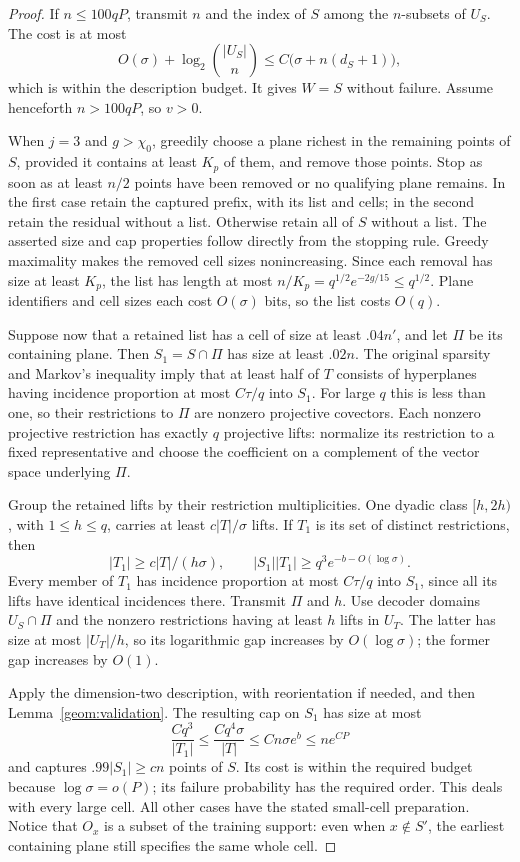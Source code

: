 \begin{proof}
If $n\leq100qP$, transmit $n$ and the index of $S$ among the
$n$-subsets of $U_S$. The cost is at most
\[
 O(\sigma)+\log_2\binom{|U_S|}{n}
 \leq C\bigl(\sigma+n(d_S+1)\bigr),
\]
which is within the description budget. It gives $W=S$ without
failure. Assume henceforth $n>100qP$, so $v>0$.

When $j=3$ and $g>\chi_0$, greedily choose a plane richest in the
remaining points of $S$, provided it contains at least $K_p$ of them,
and remove those points. Stop as soon as at least $n/2$ points have
been removed or no qualifying plane remains. In the first case retain
the captured prefix, with its list and cells; in the second retain the
residual without a list. Otherwise retain all of $S$ without a list.
The asserted size and cap properties follow directly from the stopping
rule. Greedy maximality makes the removed cell sizes nonincreasing.
Since each removal has size at least $K_p$, the list has length at
most $n/K_p=q^{1/2}e^{-2g/15}\leq q^{1/2}$. Plane identifiers and
cell sizes each cost $O(\sigma)$ bits, so the list costs $O(q)$.

Suppose now that a retained list has a cell of size at least $.04n'$,
and let $\Pi$ be its containing plane. Then
$S_1=S\cap\Pi$ has size at least $.02n$. The original sparsity and
Markov's inequality imply that at least half of $T$ consists of
hyperplanes having incidence proportion at most $C\tau/q$ into
$S_1$. For large $q$ this is less than one, so their restrictions to
$\Pi$ are nonzero projective covectors. Each nonzero projective
restriction has exactly $q$ projective lifts: normalize its restriction
to a fixed representative and choose the coefficient on a complement
of the vector space underlying $\Pi$.

Group the retained lifts by their restriction multiplicities. One
dyadic class $[h,2h)$, with $1\leq h\leq q$, carries at least
$c|T|/\sigma$ lifts. If $T_1$ is its set of distinct restrictions,
then
\[
 |T_1|\geq c|T|/(h\sigma),\qquad
 |S_1||T_1|\geq q^3e^{-b-O(\log\sigma)}.
\]
Every member of $T_1$ has incidence proportion at most $C\tau/q$
into $S_1$, since all its lifts have identical incidences there.
Transmit $\Pi$ and $h$. Use decoder domains $U_S\cap\Pi$ and the
nonzero restrictions having at least $h$ lifts in $U_T$. The latter
has size at most $|U_T|/h$, so its logarithmic gap increases by
$O(\log\sigma)$; the former gap increases by $O(1)$.

Apply the dimension-two description, with reorientation if needed,
and then Lemma~\ref{geom:validation}. The resulting cap on $S_1$
has size at most
\[
 \frac{Cq^3}{|T_1|}
 \leq\frac{Cq^4\sigma}{|T|}
 \leq Cn\sigma e^b\leq ne^{CP}
\]
and captures $.99|S_1|\geq cn$ points of $S$. Its cost is within
the required budget because $\log\sigma=o(P)$; its failure
probability has the required order. This deals with every large cell.
All other cases have the stated small-cell preparation. Notice that
$O_x$ is a subset of the training support: even when $x\notin S'$,
the earliest containing plane still specifies the same whole cell.
\end{proof}

